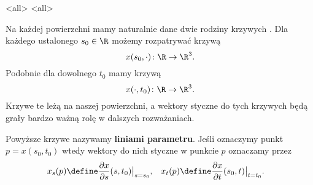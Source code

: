\mode*
\mode<all>{}
\mode<all>{}

\begin{frame}[<+->]

\begin{uwaga}
Na każdej powierzchni mamy naturalnie dane dwie rodziny krzywych . Dla każdego ustalonego $s_0\in \R$ możemy rozpatrywać krzywą \[x(s_0,\cdot)\colon \R\to \R^3.\] Podobnie dla dowolnego $t_0$ mamy krzywą \[x(\cdot,t_0)\colon \R\to \R^3.\] Krzywe te leżą na naszej powierzchni, a wektory styczne do tych krzywych będą grały bardzo ważną rolę w dalszych rozważaniach.
\end{uwaga}

\end{frame}
\begin{frame}

\begin{definicja}
Powyższe krzywe nazywamy \textbf{liniami parametru}. Jeśli oznaczymy punkt $p=x(s_0,t_0)$ wtedy wektory do nich styczne w punkcie $p$ oznaczamy przez 
\begin{align*}
x_s(p)&\define \frac{\partial{x}}{\partial{s}}(s,t_0)\big|_{s=s_0}, &x_t(p)&\define\frac{\partial{x}}{\partial{t}}(s_0,t)\big|_{t=t_0}.
\end{align*}

\pause \begin{center}

\end{center}

\end{definicja}


\end{frame}

